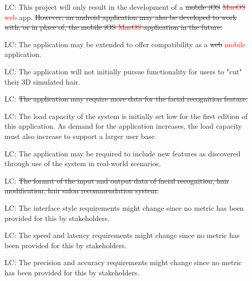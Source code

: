 \documentclass[12pt]{article}
\newcounter{lcnum} %
\begin{document}
\noindent \begin{itemize}

\item[LC\refstepcounter{lcnum}\thelcnum\label{LC_meaningfulLabel}:] 
This project will only result in the development of a \sout{mobile iOS} \sout{\textcolor{red}{MacOS}} \textcolor{red}{web} app. \sout{However, an android application may also be developed to work with, or in place of, the \sout{mobile iOS} \textcolor{red}{MacOS} application in the future.}
\item[LC\refstepcounter{lcnum}\thelcnum\label{LC_meaningfulLabel}:] 
The application may be extended to offer compatibility as a \sout{web} \textcolor{red}{mobile} application.
\item[LC\refstepcounter{lcnum}\thelcnum\label{LC_meaningfulLabel}:] 
The application will not initially pursue functionality for users to "cut" their 3D simulated hair.
\item[LC\refstepcounter{lcnum}\thelcnum\label{LC_meaningfulLabel}:] 
\sout{The application may require more data for the facial recognition feature.}
\item[LC\refstepcounter{lcnum}\thelcnum\label{LC_meaningfulLabel}:] 
The load capacity of the system is initially set low for the first edition of this application. As demand for the application increases, the load capacity must also increase to support a larger user base.
\item[LC\refstepcounter{lcnum}\thelcnum\label{LC_meaningfulLabel}:] 
The application may be required to include new features as discovered through use of the system in real-world scenarios.
\item[LC\refstepcounter{lcnum}\thelcnum\label{LC_meaningfulLabel}:]\sout{ 
The format of the
input and output data of facial recognition, hair modification, hair salon recommendation system.}
\item[LC\refstepcounter{lcnum}\thelcnum\label{LC_meaningfulLabel}:] 
The interface style requirements might change since no metric has been provided for this by stakeholders. 
\item[LC\refstepcounter{lcnum}\thelcnum\label{LC_meaningfulLabel}:] 
The speed and latency requirements might change since no metric has been provided for this by stakeholders. 
\item[LC\refstepcounter{lcnum}\thelcnum\label{LC_meaningfulLabel}:] 
The precision and accuracy requirements might change since no metric has been provided for this by stakeholders. 




\end{itemize}
\end{document}
